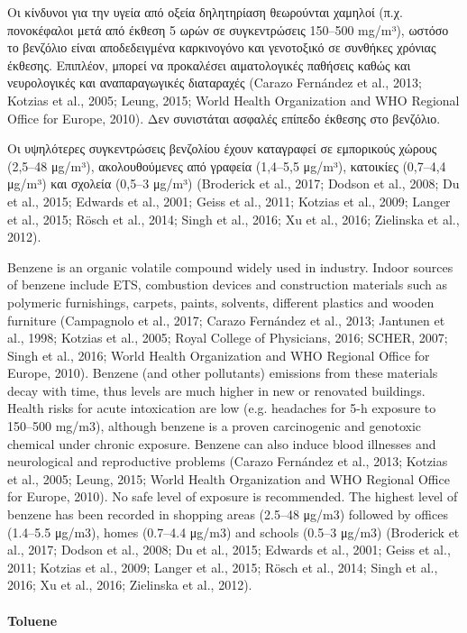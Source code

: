 Οι κίνδυνοι για την υγεία από οξεία δηλητηρίαση θεωρούνται χαμηλοί (π.χ. πονοκέφαλοι μετά από έκθεση 5 ωρών σε συγκεντρώσεις 150–500 mg/m³), ωστόσο το βενζόλιο είναι αποδεδειγμένα καρκινογόνο και γενοτοξικό σε συνθήκες χρόνιας έκθεσης. Επιπλέον, μπορεί να προκαλέσει αιματολογικές παθήσεις καθώς και νευρολογικές και αναπαραγωγικές διαταραχές (Carazo Fernández et al., 2013; Kotzias et al., 2005; Leung, 2015; World Health Organization and WHO Regional Office for Europe, 2010). Δεν συνιστάται ασφαλές επίπεδο έκθεσης στο βενζόλιο.

Οι υψηλότερες συγκεντρώσεις βενζολίου έχουν καταγραφεί σε εμπορικούς χώρους (2,5–48 μg/m³), ακολουθούμενες από γραφεία (1,4–5,5 μg/m³), κατοικίες (0,7–4,4 μg/m³) και σχολεία (0,5–3 μg/m³) (Broderick et al., 2017; Dodson et al., 2008; Du et al., 2015; Edwards et al., 2001; Geiss et al., 2011; Kotzias et al., 2009; Langer et al., 2015; Rösch et al., 2014; Singh et al., 2016; Xu et al., 2016; Zielinska et al., 2012).


Benzene is an organic volatile compound widely used in industry. Indoor sources of benzene include ETS, combustion devices and construction materials such as polymeric furnishings, carpets, paints, solvents, different plastics and wooden furniture (Campagnolo et al., 2017; Carazo Fernández et al., 2013; Jantunen et al., 1998; Kotzias et al., 2005; Royal College of Physicians, 2016; SCHER, 2007; Singh et al., 2016; World Health Organization and WHO Regional Office for Europe, 2010). Benzene (and other pollutants) emissions from these materials decay with time, thus levels are much higher in new or renovated buildings. Health risks for acute intoxication are low (e.g. headaches for 5-h exposure to 150–500 mg/m3), although benzene is a proven carcinogenic and genotoxic chemical under chronic exposure. Benzene can also induce blood illnesses and neurological and reproductive problems (Carazo Fernández et al., 2013; Kotzias et al., 2005; Leung, 2015; World Health Organization and WHO Regional Office for Europe, 2010). No safe level of exposure is recommended. The highest level of benzene has been recorded in shopping areas (2.5–48 μg/m3) followed by offices (1.4–5.5 μg/m3), homes (0.7–4.4 μg/m3) and schools (0.5–3 μg/m3) (Broderick et al., 2017; Dodson et al., 2008; Du et al., 2015; Edwards et al., 2001; Geiss et al., 2011; Kotzias et al., 2009; Langer et al., 2015; Rösch et al., 2014; Singh et al., 2016; Xu et al., 2016; Zielinska et al., 2012).


\paragraph{Toluene}

